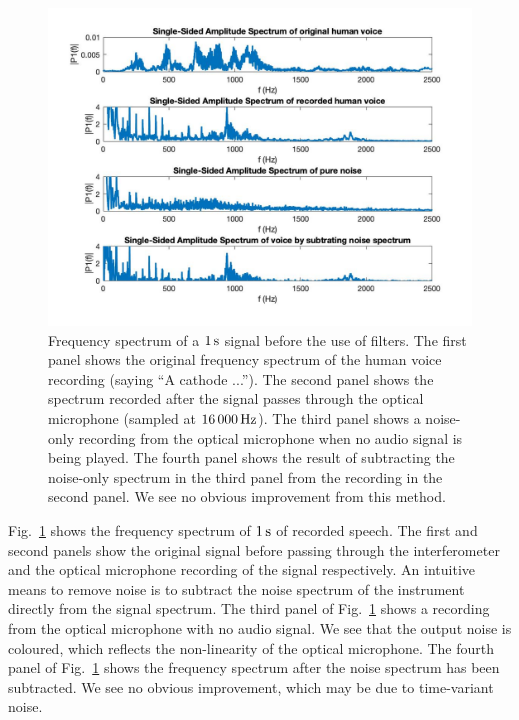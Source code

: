 \documentclass[paper-main.tex]{subfiles}
\begin{document}
\begin{figure}
\begin{center}
\includegraphics[width=\textwidth]{figures/freqSpectrumOriginalNoiseSubtracted.jpg}
\end{center}
\caption{\label{fig:noiseSubtract}
Frequency spectrum of a $1\,{\rm s}$ signal before the use of filters. 
The first panel shows the original frequency spectrum of the human voice recording (saying ``A cathode ...''). 
The second panel shows the spectrum recorded after the signal passes through the optical microphone (sampled at $16\,000\,{\rm Hz}$).
The third panel shows a noise-only recording from the optical microphone when no audio signal is being played. 
The fourth panel shows the result of subtracting the noise-only spectrum in the third panel from the recording in the second panel. 
We see no obvious improvement from this method. 
}
\end{figure}

Fig.~\ref{fig:noiseSubtract} shows the frequency spectrum of $1\,{\rm s}$ of recorded speech. 
The first and second panels show the original signal before passing through the interferometer and the optical microphone recording of the signal respectively. 
An intuitive means to remove noise is to subtract the noise spectrum of the instrument directly from the signal spectrum. 
The third panel of Fig.~\ref{fig:noiseSubtract} shows a recording from the optical microphone with no audio signal. 
We see that the output noise is coloured, which reflects the non-linearity of the optical microphone.
The fourth panel of Fig.~\ref{fig:noiseSubtract} shows the frequency spectrum after the noise spectrum has been subtracted. 
We see no obvious improvement, which may be due to time-variant noise. 
\end{document}
